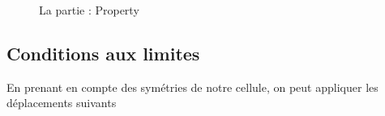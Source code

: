 \documentclass{article}
\begin{document}
\begin{figure}[H]
\begin{minipage}[h]{0.49\linewidth}
    \end{minipage}
    \caption{La partie : Property}
\end{figure}
\par

\subsection{Conditions aux limites}
En prenant en compte des symétries de notre cellule, on peut appliquer les déplacements suivants 
\end{document}
